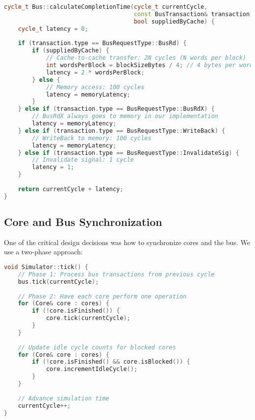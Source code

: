 \documentclass[11pt]{article}
\begin{document}
\begin{lstlisting}[language=C++, caption=Latency Calculation in Bus.cpp]
cycle_t Bus::calculateCompletionTime(cycle_t currentCycle, 
                                     const BusTransaction& transaction, 
                                     bool suppliedByCache) {
    cycle_t latency = 0;
    
    if (transaction.type == BusRequestType::BusRd) {
        if (suppliedByCache) {
            // Cache-to-cache transfer: 2N cycles (N words per block)
            int wordsPerBlock = blockSizeBytes / 4; // 4 bytes per word
            latency = 2 * wordsPerBlock;
        } else {
            // Memory access: 100 cycles
            latency = memoryLatency;
        }
    } else if (transaction.type == BusRequestType::BusRdX) {
        // BusRdX always goes to memory in our implementation
        latency = memoryLatency;
    } else if (transaction.type == BusRequestType::WriteBack) {
        // WriteBack to memory: 100 cycles
        latency = memoryLatency;
    } else if (transaction.type == BusRequestType::InvalidateSig) {
        // Invalidate signal: 1 cycle
        latency = 1;
    }
    
    return currentCycle + latency;
}
\end{lstlisting}

\subsection{Core and Bus Synchronization}

One of the critical design decisions was how to synchronize cores and the bus. We use a two-phase approach:

\begin{lstlisting}[language=C++, caption=Simulator's Tick Function]
void Simulator::tick() {
    // Phase 1: Process bus transactions from previous cycle
    bus.tick(currentCycle);
    
    // Phase 2: Have each core perform one operation
    for (Core& core : cores) {
        if (!core.isFinished()) {
            core.tick(currentCycle);
        }
    }
    
    // Update idle cycle counts for blocked cores
    for (Core& core : cores) {
        if (!core.isFinished() && core.isBlocked()) {
            core.incrementIdleCycle();
        }
    }
    
    // Advance simulation time
    currentCycle++;
}
\end{lstlisting}
\end{document}
